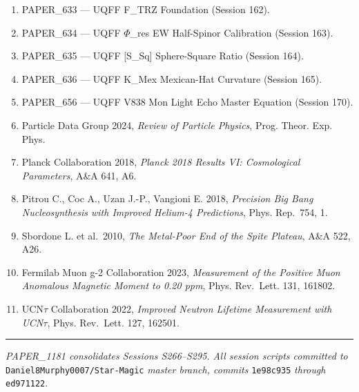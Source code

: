 \documentclass[
]{article}
\providecommand{\tightlist}{
  \setlength{\itemsep}{0pt}\setlength{\parskip}{0pt}}
\begin{document}
\begin{enumerate}
\def\labelenumi{\arabic{enumi}.}
\tightlist
\item
  PAPER\_633 --- UQFF F\_TRZ Foundation (Session 162).
\item
  PAPER\_634 --- UQFF \(\Phi\)\_res EW Half-Spinor Calibration (Session
  163).
\item
  PAPER\_635 --- UQFF {[}S\_Sq{]} Sphere-Square Ratio (Session 164).
\item
  PAPER\_636 --- UQFF K\_Mex Mexican-Hat Curvature (Session 165).
\item
  PAPER\_656 --- UQFF V838 Mon Light Echo Master Equation (Session 170).
\item
  Particle Data Group 2024, \emph{Review of Particle Physics}, Prog.
  Theor. Exp. Phys.
\item
  Planck Collaboration 2018, \emph{Planck 2018 Results VI: Cosmological
  Parameters}, A\&A 641, A6.
\item
  Pitrou C., Coc A., Uzan J.-P., Vangioni E. 2018, \emph{Precision Big
  Bang Nucleosynthesis with Improved Helium-4 Predictions}, Phys.
  Rep.~754, 1.
\item
  Sbordone L. et al.~2010, \emph{The Metal-Poor End of the Spite
  Plateau}, A\&A 522, A26.
\item
  Fermilab Muon g-2 Collaboration 2023, \emph{Measurement of the
  Positive Muon Anomalous Magnetic Moment to 0.20 ppm}, Phys. Rev.~Lett.
  131, 161802.
\item
  UCN\(\tau\) Collaboration 2022, \emph{Improved Neutron Lifetime
  Measurement with UCN\(\tau\)}, Phys. Rev.~Lett. 127, 162501.
\end{enumerate}

\begin{center}\rule{0.5\linewidth}{0.5pt}\end{center}

\emph{PAPER\_1181 consolidates Sessions S266--S295. All session scripts
committed to} \texttt{Daniel8Murphy0007/Star-Magic} \emph{master branch,
commits} \texttt{1e98c935} \emph{through} \texttt{ed971122}.
\end{document}
